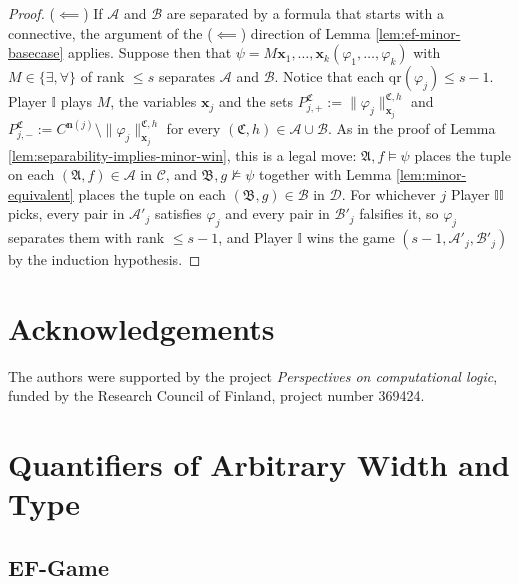 \documentclass{article}
\theoremstyle{definition}
\begin{document}
\begin{proof}
    ($\impliedby$) If $\mathcal{A}$ and $\mathcal{B}$ are separated by a formula that starts with a connective, the argument of the ($\impliedby$) direction of Lemma \ref{lem:ef-minor-basecase} applies. Suppose then that $\psi=M\mathbf x_1,\dots,\mathbf x_k(\varphi_1,\dots,\varphi_k)$ with $M\in\{\exists,\forall\}$ of rank $\le s$ separates $\mathcal{A}$ and $\mathcal{B}$. Notice that each $\mathrm{qr}(\varphi_j)\le s-1$. Player $\mathbb{I}$ plays $M$, the variables $\mathbf x_j$ and the sets $P^{\mathfrak C}_{j,+}:=\|\varphi_j\|^{\mathfrak C,h}_{\mathbf x_j}$ and $P^{\mathfrak C}_{j,-}:=C^{\mathbf n(j)}\setminus\|\varphi_j\|^{\mathfrak C,h}_{\mathbf x_j}$ for every $(\mathfrak C,h)\in\mathcal A\cup\mathcal B$. As in the proof of Lemma \ref{lem:separability-implies-minor-win}, this is a legal move: $\mathfrak A,f\models\psi$ places the tuple on each $(\mathfrak A,f)\in\mathcal A$ in $\mathcal C$, and $\mathfrak B,g\not\models\psi$ together with Lemma \ref{lem:minor-equivalent} places the tuple on each $(\mathfrak B,g)\in\mathcal B$ in $\mathcal D$. For whichever $j$ Player $\mathbb{II}$ picks, every pair in $\mathcal A'_j$ satisfies $\varphi_j$ and every pair in $\mathcal B'_j$ falsifies it, so $\varphi_j$ separates them with rank $\le s-1$, and Player $\mathbb{I}$ wins the game $(s-1,\mathcal A'_j,\mathcal B'_j)$ by the induction hypothesis.
\end{proof}

\section*{Acknowledgements}

The authors were supported by the project \textit{Perspectives on computational logic}, funded by the Research Council of Finland, project number 369424.




\clearpage
\appendix

\section{Quantifiers of Arbitrary Width and Type}\label{app:arbitrary}

\subsection{EF-Game}
\end{document}
